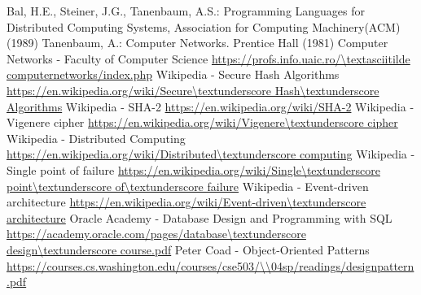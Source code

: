 \documentclass[runningheads]{llncs}
\begin{document}
\begin{thebibliography}{8}

\bibitem{}
Bal, H.E., Steiner, J.G., Tanenbaum, A.S.: Programming Languages for Distributed Computing Systems, Association for Computing Machinery(ACM) (1989)
\bibitem{}
Tanenbaum, A.: Computer Networks. Prentice Hall (1981)
\bibitem{}
Computer Networks - Faculty of Computer Science \url{https://profs.info.uaic.ro/\textasciitilde computernetworks/index.php}
\bibitem{}
Wikipedia - Secure Hash Algorithms \url{https://en.wikipedia.org/wiki/Secure\textunderscore Hash\textunderscore Algorithms}
\bibitem{}
Wikipedia - SHA-2 \url{https://en.wikipedia.org/wiki/SHA-2}
\bibitem{}
Wikipedia - Vigenere cipher \url{https://en.wikipedia.org/wiki/Vigenere\textunderscore cipher}
\bibitem{}
Wikipedia - Distributed Computing \url{https://en.wikipedia.org/wiki/Distributed\textunderscore computing}
\bibitem{}
Wikipedia - Single point of failure \url{https://en.wikipedia.org/wiki/Single\textunderscore point\textunderscore of\textunderscore failure}
\bibitem{}
Wikipedia - Event-driven architecture \url{https://en.wikipedia.org/wiki/Event-driven\textunderscore architecture}
\bibitem{}
Oracle Academy - Database Design and Programming with SQL \url{https://academy.oracle.com/pages/database\textunderscore design\textunderscore course.pdf}
\bibitem{}
Peter Coad - Object-Oriented Patterns \url{https://courses.cs.washington.edu/courses/cse503/\\04sp/readings/designpattern.pdf}

\end{thebibliography}
\end{document}
